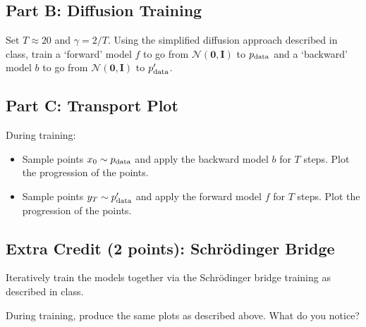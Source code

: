 \documentclass{article}
\begin{document}
\subsection*{Part B: Diffusion Training}

Set $T \approx 20$ and $\gamma = 2/T$.
Using the simplified diffusion approach described in class, train a `forward' model $f$ to go from $\mathcal{N}(\mathbf{0}, \mathbf{I})$ to $p_{\textnormal{data}}$ and a `backward' model $b$ to go from $\mathcal{N}(\mathbf{0}, \mathbf{I})$ to $p_{\textnormal{data}}'$.

\subsection*{Part C: Transport Plot}

During training:
\begin{itemize}
    \item Sample points $x_0 \sim p_{\textnormal{data}}$ and apply the backward model $b$ for $T$ steps. Plot the progression of the points.
    \item Sample points $y_T \sim p_{\textnormal{data}}'$ and apply the forward model $f$ for $T$ steps. Plot the progression of the points.
\end{itemize}

\subsection*{Extra Credit (2 points): Schr\"{o}dinger Bridge}

Iteratively train the models together via the Schr\"{o}dinger bridge training as described in class.

During training, produce the same plots as described above. What do you notice?
\end{document}
